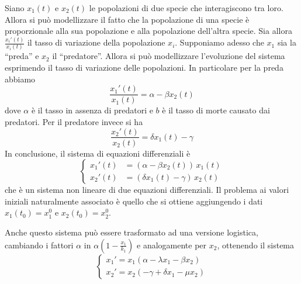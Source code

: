 \begin{example}
    Siano \(x_{1}(t)\) e \(x_{2}(t)\) le popolazioni di due specie che interagiscono
    tra loro. Allora si può modellizzare il fatto che la popolazione di una
    specie è proporzionale alla sua popolazione e alla popolazione dell'altra
    specie. Sia allora \(\frac{x_{i}'(t)}{x_{i}(t)}\) il tasso di variazione
    della popolazione \(x_{i}\). Supponiamo adesso che \(x_{1}\) sia la
    ``preda'' e \(x_{2}\) il ``predatore''. Allora si può modellizzare
    l'evoluzione del sistema esprimendo il tasso di variazione delle
    popolazioni. In particolare per la preda abbiamo
    \[
        \frac{x_{1}'(t)}{x_{1}(t)} = \alpha - \beta x_{2}(t)
    \]
    dove \(\alpha\) è il tasso in assenza di predatori e \(b\) è il tasso di
    morte causato dai predatori. Per il predatore invece si ha
    \[
        \frac{x_{2}'(t)}{x_{2}(t)} = \delta x_{1}(t) - \gamma
    \]
    In conclusione, il sistema di equazioni differenziali è
    \[
        \begin{cases}
            x_{1}'(t) &= (\alpha - \beta x_{2}(t))\,x_{1}(t) \\
            x_{2}'(t) &= (\delta x_{1}(t) - \gamma)\,x_{2}(t)
        \end{cases}
    \]
    che è un sistema non lineare di due equazioni differenziali. Il problema ai
    valori iniziali naturalmente associato è quello che si ottiene aggiungendo i
    dati \(x_{1}(t_{0}) = x_{1}^{0}\) e \(x_{2}(t_{0}) = x_{2}^{0}\).

    Anche questo sistema può essere trasformato ad una versione logistica,
    cambiando i fattori \(\alpha \) in \(\alpha(1 - \frac{x_{1}}{k_{1}})\) e
    analogamente per \(x_{2}\), ottenendo il sistema
    \[
        \begin{cases}
            x_{1}' = x_{1}(\alpha - \lambda x_{1} - \beta x_{2}) \\
            x_{2}' = x_{2} (-\gamma + \delta x_{1} - \mu x_{2})
        \end{cases}
    \]
\end{example}

